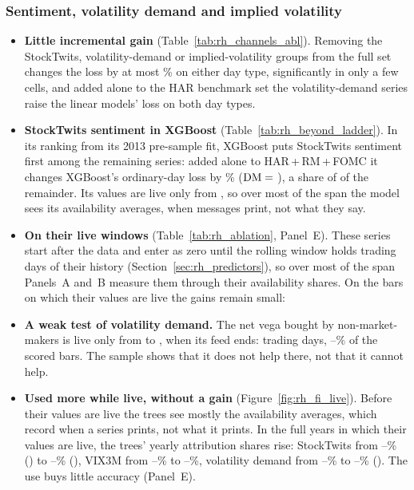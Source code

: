 \subsubsection{Sentiment, volatility demand and implied volatility}
\label{sec:rh_fi_alt}
\begin{itemize}
\item \textbf{Little incremental gain} (Table~\ref{tab:rh_channels_abl}). Removing the StockTwits, volatility-demand
  or implied-volatility groups from the full set changes the loss by at most \rhchAltLoMaxAbs\% on either day type,
  significantly in only a few cells, and added alone to the HAR benchmark set the volatility-demand series raise the
  linear models' loss on both day types.
\item \textbf{StockTwits sentiment in XGBoost} (Table~\ref{tab:rh_beyond_ladder}). In its ranking from its 2013
  pre-sample fit, XGBoost puts StockTwits sentiment first among the remaining series: added alone to HAR\,+\,RM\,+\,FOMC it changes XGBoost's ordinary-day
  loss by \rhbyLXgbKOneOrdPct\% ($\mathrm{DM}={}$\rhbyLXgbKOneOrdDm), a share of \rhbyLXgbKOneOrdR{} of the remainder. Its
  values are live only from \rhabLiveSentStart, so over most of the span the model sees its availability averages,
  when messages print, not what they say.
\item \textbf{On their live windows} (Table~\ref{tab:rh_ablation}, Panel~E). These series start after the data and
  enter as zero until the rolling window holds \rhorWindowDays{} trading days of their history
  (Section~\ref{sec:rh_predictors}), so over most of the span Panels~A and~B measure them through their availability
  shares. On the bars on which their values are live the gains remain small:
\item \textbf{A weak test of volatility demand.} The net vega bought by non-market-makers is live only from
  \rhabLiveVdStart{} to \rhabLiveVdEnd, when its feed ends: \rhabLiveVdDays{} trading days,
  \rhlvVdEvLo--\rhlvVdEvHi\% of the scored bars. The sample shows that it does not help there, not that it cannot
  help.
\item \textbf{Used more while live, without a gain} (Figure~\ref{fig:rh_fi_live}). Before their values are live the
  trees see mostly the availability averages, which record when a series prints, not what it prints. In the full
  years in which their values are live, the trees' yearly attribution shares rise: StockTwits from
  \rhfilStwPreMin--\rhfilStwPreMax\% (\rhfilStwPreYears) to \rhfilStwLiveMin--\rhfilStwLiveMax\%
  (\rhfilStwLiveYears), VIX3M from \rhfilVixThreePreMin--\rhfilVixThreePreMax\% to
  \rhfilVixThreeLiveMin--\rhfilVixThreeLiveMax\%, volatility demand from \rhfilVdPreMin--\rhfilVdPreMax\% to
  \rhfilVdLiveMin--\rhfilVdLiveMax\% (\rhfilVdLiveYears). The use buys little accuracy (Panel~E).
\end{itemize}

